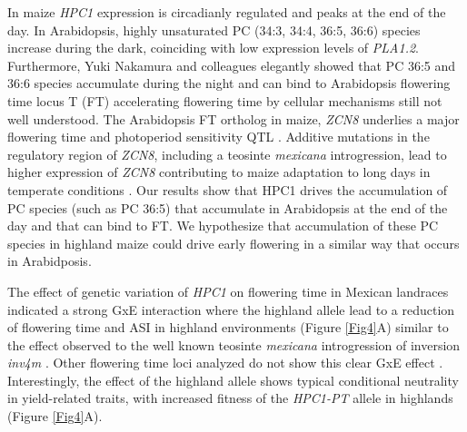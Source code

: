 \documentclass[9pt,twocolumn,twoside,lineno]{BioRxiv}
\begin{document}
In maize \textit{HPC1} expression is circadianly regulated\cite{Khan2010-iv} and peaks at the end of the day. 
In Arabidopsis, highly unsaturated PC (34:3, 34:4, 36:5, 36:6) species increase during the dark\cite{Maatta2012-ip}, coinciding with low expression levels of \textit{PLA1.2}\cite{Khan2010-iv}.
Furthermore, Yuki Nakamura and colleagues elegantly showed that PC 36:5 and 36:6 species accumulate during the night and can bind to Arabidopsis flowering time locus T (FT) accelerating flowering time \cite{Nakamura2014-qf} by cellular mechanisms still not well understood. 
The Arabidopsis FT ortholog in maize, \textit{ZCN8} \cite{Lazakis2011-nq} underlies a major flowering time and photoperiod sensitivity QTL \cite{Hung2012-ms}.
Additive mutations in the regulatory region of \textit{ZCN8}, including a teosinte \textit{mexicana} introgression, lead to higher expression of \textit{ZCN8} contributing to maize adaptation to long days in temperate conditions \cite{Guo2019-pn}.
Our results show that HPC1 drives the accumulation of PC species (such as PC 36:5) that accumulate in Arabidopsis at the end of the day and that can bind to FT. 
We hypothesize that accumulation of these PC species in highland maize could drive early flowering in a similar way that occurs in Arabidposis. 

The effect of genetic variation of \textit{HPC1} on flowering time in Mexican landraces indicated a strong GxE interaction where the highland allele lead to a reduction of flowering time and ASI in highland environments (Figure \ref{Fig4}A) similar to the effect observed to the well known teosinte \textit{mexicana} introgression of inversion \textit{inv4m} \cite{Crow2020-gene}.
Other flowering time loci analyzed do not show this clear GxE effect \cite{Gates2019-xu}.
Interestingly, the effect of the highland allele shows typical conditional neutrality in yield-related traits, with increased fitness of the \textit{HPC1-PT} allele in highlands (Figure \ref{Fig4}A).
\end{document}
